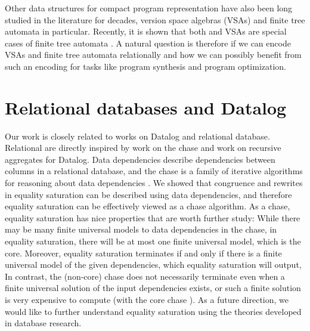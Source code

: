 Other data structures for compact program representation 
 have also been long studied in the literature for decades,
 version space algebras (VSAs) \citep{vsa,flashmeta} 
 and finite tree automata \citep{blaze, dace} in particular.
Recently, it is shown that both \egraphs and VSAs are special cases of finite tree automata \citep{vsa-eq-fta}.
A natural question is therefore if we can encode VSAs and finite tree automata relationally
 and how we can possibly benefit from such an encoding for tasks 
 like program synthesis and program optimization.

\section{Relational databases and Datalog}

Our work is closely related to works on Datalog and relational database.
Relational \egraphs are directly inspired by work on the chase 
 and work on recursive aggregates for Datalog.
Data dependencies describe dependencies between columns in a relational database, 
 and the chase is a family of iterative algorithms
 for reasoning about data dependencies \citep{chase-revisited, bench-chase}.
We showed that congruence and rewrites in equality saturation 
 can be described using data dependencies, 
 and therefore equality saturation can be effectively viewed as a chase algorithm.
As a chase, equality saturation has nice properties that are worth further study:
While there may be many finite universal models to data dependencies in the chase,
 in equality saturation,
 there will be at most one finite universal model, 
 which is the core.
Moreover,
 equality saturation terminates 
 if and only if there is a finite universal model of the given dependencies, 
 which equality saturation will output,
In contrast,
 the (non-core) chase does not necessarily terminate 
 even when a finite universal solution of the input dependencies exists,
 or such a finite solution is very expensive to compute (with the core chase \citep{chase-revisited}).
As a future direction,
 we would like to further understand equality saturation using the theories developed 
 in database research.










